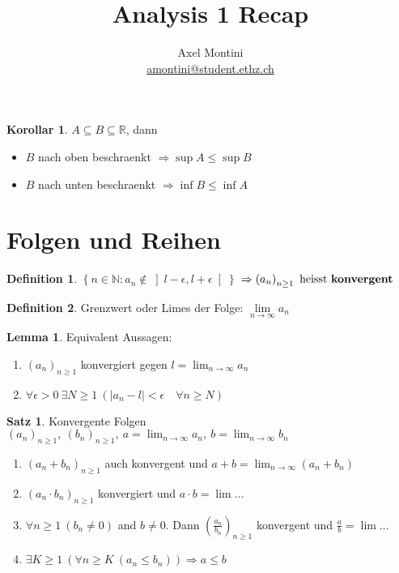 \documentclass[10pt,a4paper,twocolumn]{article}
\title{Analysis 1 Recap}
\author{Axel Montini \\ \href{mailto:amontini@student.ethz.ch}{amontini@student.ethz.ch}}
\newcommand{\N}{\mathbb{N}}
\newcommand{\R}{\mathbb{R}}
\theoremstyle{definition}
\newtheorem{definition}{Definition}[section]
\newtheorem{lemma}{Lemma}[section]
\newtheorem{satz}{Satz}[section]
\newtheorem{korollar}{Korollar}[section]
\newcommand{\seq}[1]{\left( #1_n \right)_{n \ge 1}}
\begin{document}
\maketitle

\begin{korollar}
    \label{korollar:inf-sup}
    $A \subseteq B \subseteq \R$, dann
    \begin{itemize}
        \item $B$ nach oben beschraenkt $\Rightarrow \sup A \le \sup B$
        \item $B$ nach unten beschraenkt $\Rightarrow \inf B \le \inf A$
    \end{itemize}
\end{korollar}

\section{Folgen und Reihen}
\begin{definition}
    $\left\{ n \in \N : a_n \notin \left] l - \epsilon, l + \epsilon \right[ \right\}$
    $\Rightarrow \seq{a}\ \mbox{heisst \textbf{konvergent}}$
\end{definition}

\begin{definition}
    Grenzwert oder Limes der Folge: $\underset{n \to \infty}{\lim} a_n$
\end{definition}

\begin{lemma}
    Equivalent Aussagen:
    \begin{enumerate}
        \item $\seq{a}$ konvergiert gegen $l = \lim_{n \to \infty} a_n$
        \item $\forall \epsilon > 0\ \exists N \ge 1\ \left( \lvert a_n - l \rvert < \epsilon \quad \forall n \ge N \right)$
    \end{enumerate}
\end{lemma}

\begin{satz}
    Konvergente Folgen $\seq{a},\ \seq{b},\ a = \lim_{n \to \infty} a_n,\ b = \lim_{n \to \infty} b_n$
    \begin{enumerate}
        \item $(a_n + b_n)_{n \ge 1}$ auch konvergent und $a + b = \lim_{n \to \infty} (a_n + b_n)$
        \item $(a_n \cdot b_n)_{n \ge 1}$ konvergiert und $a \cdot b = \lim \dots$
        \item $\forall n \ge 1\ (b_n \ne 0)$ and $b \ne 0$. Dann $\left(\frac{a_n}{b_n}\right)_{n \ge 1}$ konvergent und $\frac{a}{b} = \lim \dots$
        \item $\exists K \ge 1\ \left(\forall n \ge K\ (a_n \le b_n)\right) \Rightarrow a \le b$
    \end{enumerate}
\end{satz}
\end{document}

